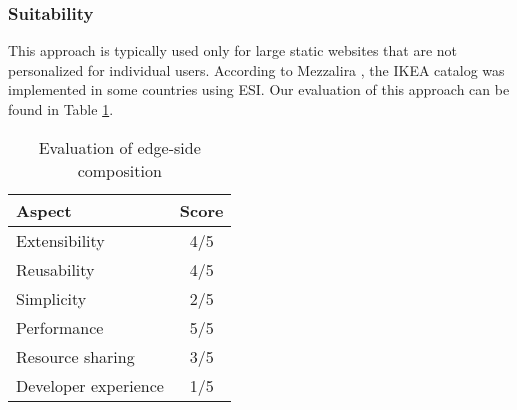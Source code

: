 \subsubsection{Suitability}
This approach is typically used only for large static websites that are not personalized for individual users. According to Mezzalira \cite{MezzaliraBuildingMf}, the IKEA catalog was implemented in some countries using ESI. Our evaluation of this approach can be found in Table \ref{table:esi-evaluation}.
\begin{table}[h]
  \centering
  \begin{tabular}{|p{4cm}|c|}
    \hline
      \textbf{Aspect} & \textbf{Score} \\
    \hline
      Extensibility & 4/5 \\
    \hline
      Reusability & 4/5 \\
    \hline
      Simplicity & 2/5 \\
    \hline
      Performance & 5/5 \\
    \hline
      Resource sharing & 3/5 \\
    \hline
      Developer experience & 1/5 \\
    \hline
  \end{tabular}
  \caption{Evaluation of edge-side composition}
  \label{table:esi-evaluation}
\end{table}



